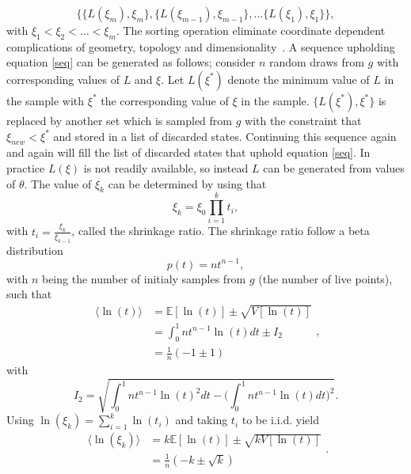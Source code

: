 \documentclass[fleqn,usenatbib,nofootinbib]{revtex4-2}
\begin{document}
\begin{appendices}
		\begin{equation}
			\{\{L(\xi_m),\xi_m\},\{L(\xi_{m-1}),\xi_{m-1}\},\dots\{L(\xi_1),\xi_1\}\},
			\label{seq}
		\end{equation}
		with $\xi_1<\xi_2<\dots <\xi_m$. The sorting operation eliminate coordinate dependent complications of geometry, topology and dimensionality~\citep{skilling2006}. A sequence upholding equation \eqref{seq} can be generated as follows; consider $n$ random draws from $g$ with corresponding values of $L$ and $\xi$. Let $L(\xi^*)$ denote the minimum value of $L$ in the sample with $\xi^*$ the corresponding value of $\xi$ in the sample. $\{L(\xi^*), \xi^*\}$ is replaced by another set which is sampled from $g$ with the constraint that $\xi_{new}<\xi^*$ and stored in a list of discarded states. Continuing this sequence again and again will fill the list of discarded states that uphold equation \eqref{seq}. In practice $L(\xi)$ is not readily available, so instead $L$ can be generated from values of $\theta$. The value of $\xi_k$ can be determined by using that~\citep{skilling2004}
		\begin{equation}
			\xi_k=\xi_0\prod_{i=1}^{k}t_i,
		\end{equation}
		with $t_i=\frac{\xi_k}{\xi_{k-1}}$, called the shrinkage ratio. The shrinkage ratio follow a beta distribution
		\begin{equation}
			p(t)=nt^{n-1},
		\end{equation}
		with $n$ being the number of initialy samples from $g$ (the number of live points), such that 
		\begin{equation}
			\begin{split}
				\langle\ln(t)\rangle&=\mathbb{E}[\ln(t)]\pm \sqrt{V[\ln(t)]}\\
				&=\int_0^1 nt^{n-1}\ln(t)dt\pm I_2\\
				&=\frac{1}{n}(-1\pm 1)
			\end{split},
		\end{equation}
		with 
		\begin{equation}
			I_2 = \sqrt{\int_0^1nt^{n-1}\ln(t)^2dt-\bigg(\int_0^1nt^{n-1}\ln(t)dt\bigg)^2}.
		\end{equation}
		Using $\ln(\xi_k)=\sum_{i=1}^k\ln(t_i)$ and taking $t_i$ to be i.i.d. yield
		\begin{equation}
			\begin{split}
				\langle\ln(\xi_k)\rangle&=k\mathbb{E}[\ln(t)]\pm \sqrt{kV[\ln(t)]}\\
				&=\frac{1}{n}(-k\pm \sqrt{k})
			\end{split}.

\end{equation}
\end{appendices}
\end{document}
